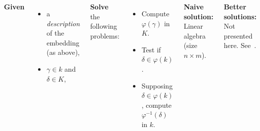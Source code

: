 \documentclass[20pt,a0paper,blockverticalspace=10mm]{tikzposter}
\begin{document}
\begin{columns}
{    \textbf{Given}
    \begin{itemize}
    \item a \emph{description} of the embedding (as above),
    \item $\gamma\in k$ and $\delta\in K$,
    \end{itemize}

    \textbf{Solve} the following problems:
    \begin{itemize}
    \item Compute $\varphi(\gamma)$ in $K$.
    \item Test if $\delta\in\varphi(k)$.
    \item Supposing $\delta\in\varphi(k)$, compute $\varphi^{-1}(\delta)$ in $k$.
    \end{itemize}
    
    \textbf{Naive solution:} Linear algebra (size $n\times m$).

    \textbf{Better solutions:} Not presented here. See~\cite{ffisom-long}.
  }


\end{columns}
\end{document}
